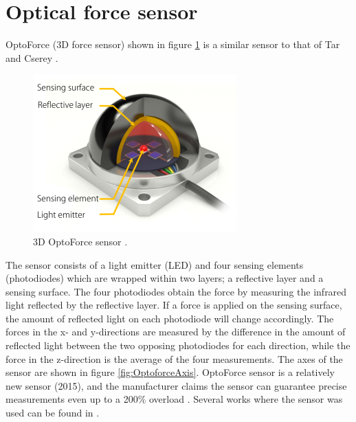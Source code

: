 \documentclass[USenglish]{ifimaster}  %
\begin{document}
\section{Optical force sensor}\label{sub:Optoforce}
OptoForce (3D force sensor) \cite{Optoforce} shown in figure \ref{fig:OptoforceBuild} is a similar sensor to that of Tar and Cserey \cite{6027100}. 

\begin{figure}[h]
	\centering
	\includegraphics[scale=0.8]{Figures/OptoforceBuild}
	\caption[3D OptoForce sensor]{3D OptoForce sensor \cite{OptoforceFig}.}
	\label{fig:OptoforceBuild}
\end{figure}
\FloatBarrier

The sensor consists of a light emitter (LED) and four sensing elements (photodiodes) which are wrapped within two layers; a reflective layer and a sensing surface. The four photodiodes obtain the force by measuring the infrared light reflected by the reflective layer. If a force is applied on the sensing surface, the amount of reflected light on each photodiode will change accordingly. The forces in the x- and y-directions are measured by the difference in the amount of reflected light between the two opposing photodiodes for each direction, while the force in the z-direction is the average of the four measurements. The axes of the sensor are shown in figure \ref{fig:OptoforceAxis}. OptoForce sensor is a relatively new sensor (2015), and the manufacturer claims the sensor can guarantee precise measurements even up to a 200\% overload \cite{Optoforce2}. Several works where the sensor was used can be found in \cite{7803326,7759112,7849467}.
\end{document}
